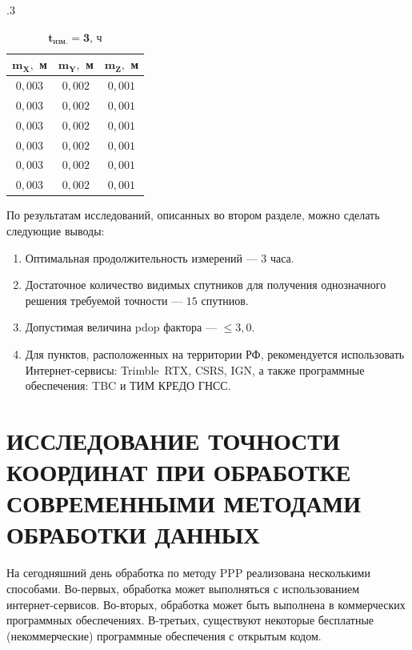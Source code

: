 \begin{table} [htbp]
{%
\begin{subtable}{.3\linewidth}	
	\centering
	\caption*{$\mathbf{t_\text{изм.}=3\text{, ч}}$}
	\begin{tabular}{|c|c|c|}
		\hline
		$\mathbf{m_{X},}$ м& $\mathbf{m_{Y},}$ м& $\mathbf{m_{Z},}$ м\\ \hline
		$0,003$			& $0,002$			& $0,001$			\\ \hline
		$0,003$			& $0,002$			& $0,001$			\\ \hline
		$0,003$			& $0,002$			& $0,001$			\\ \hline
		$0,003$			& $0,002$			& $0,001$			\\ \hline
		$0,003$			& $0,002$			& $0,001$			\\ \hline
		$0,003$			& $0,002$			& $0,001$			\\ \hline
	\end{tabular}
\end{subtable}\hfill%
	}
%	
\end{table}	

По результатам исследований, описанных во втором разделе, можно сделать следующие выводы:
\begin{enumerate}
	\item Оптимальная продолжительность измерений --- $3$ часа. 
	\item Достаточное количество видимых спутников для получения однозначного решения требуемой точности --- $15$ спутниов.
	\item Допустимая величина pdop фактора --- $\leqslant3,0$.
	\item Для пунктов, расположенных на территории РФ, рекомендуется использовать 
	Интернет-сервисы: Trimble~RTX, CSRS, IGN, а также программные обеспечения: TBC и ТИМ КРЕДО ГНСС.
\end{enumerate}
%
%
%
%

\else %
\chapter{ИССЛЕДОВАНИЕ ТОЧНОСТИ КООРДИНАТ ПРИ ОБРАБОТКЕ СОВРЕМЕННЫМИ МЕТОДАМИ ОБРАБОТКИ ДАННЫХ }\label{ch:ch2}

На сегодняшний день обработка по методу PPP реализована несколькими способами. Во-первых, обработка может выполняться с использованием интернет-сервисов. Во-вторых, обработка может быть выполнена в коммерческих программных обеспечениях. В-третьих, существуют некоторые бесплатные (некоммерческие) программные обеспечения с открытым кодом.

